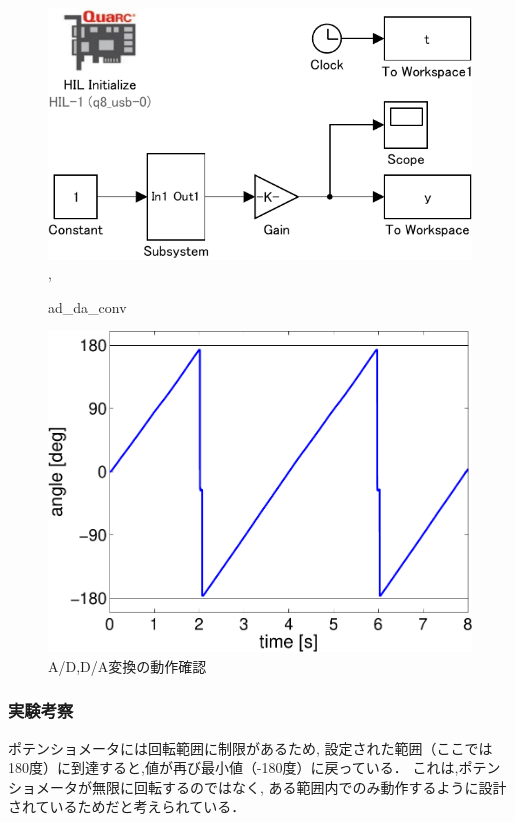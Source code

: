 \begin{figure}[h]
  \centering
  \includegraphics[scale=1]{sozai/ad_da_conv-crop.pdf},
  \caption{ad\_da\_conv}
\end{figure}

\begin{figure}[h]
  \centering
  \includegraphics[scale=0.5]{sozai/figure_ad_da-crop.pdf}
  \caption{A/D,D/A変換の動作確認}
\end{figure}

\subsubsection{実験考察}
ポテンショメータには回転範囲に制限があるため,
設定された範囲（ここでは180度）に到達すると,値が再び最小値（-180度）に戻っている．
これは,ポテンショメータが無限に回転するのではなく,
ある範囲内でのみ動作するように設計されているためだと考えられている．


